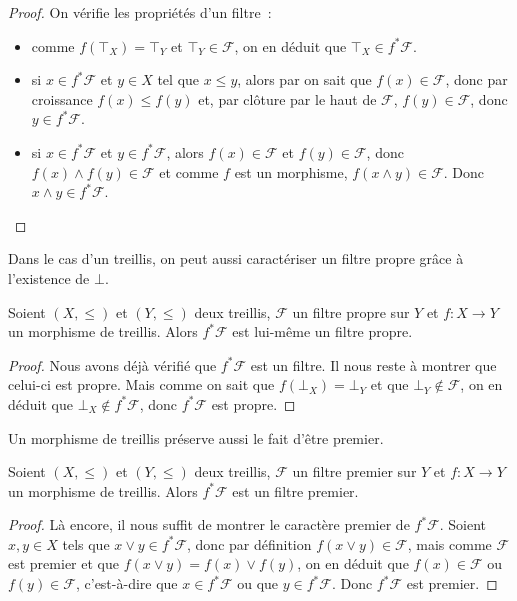 \begin{proof}
  On vérifie les propriétés d'un filtre~:
  \begin{itemize}
  \item comme $f(\top_X) = \top_Y$ et $\top_Y \in \mathcal F$, on en déduit que
    $\top_X\in f^*\mathcal F$.
  \item si $x\in f^*\mathcal F$ et $y\in X$ tel que $x\leq y$, alors par
    on sait que $f(x)\in\mathcal F$, donc par croissance $f(x)\leq f(y)$ et,
    par clôture par le haut de $\mathcal F$, $f(y)\in \mathcal F$, donc
    $y\in f^*\mathcal F$.
  \item si $x\in f^*\mathcal F$ et $y\in f^*\mathcal F$, alors
    $f(x)\in\mathcal F$ et $f(y)\in\mathcal F$, donc
    $f(x)\land f(y)\in\mathcal F$ et comme $f$ est un morphisme,
    $f(x\land y)\in\mathcal F$. Donc $x\land y\in f^*\mathcal F$.
  \end{itemize}
\end{proof}

Dans le cas d'un treillis, on peut aussi caractériser un filtre propre grâce à
l'existence de $\bot$.

\begin{property}
  Soient $(X,\leq)$ et $(Y,\leq)$ deux treillis, $\mathcal F$ un filtre propre
  sur $Y$ et $f : X \to Y$ un morphisme de treillis. Alors $f^*\mathcal F$ est
  lui-même un filtre propre.
\end{property}

\begin{proof}
  Nous avons déjà vérifié que $f^*\mathcal F$ est un filtre. Il nous reste à
  montrer que celui-ci est propre. Mais comme on sait que $f(\bot_X)=\bot_Y$
  et que $\bot_Y\notin\mathcal F$, on en déduit que
  $\bot_X\notin f^*\mathcal F$, donc $f^* \mathcal F$ est propre.
\end{proof}

Un morphisme de treillis préserve aussi le fait d'être premier.

\begin{property}
  Soient $(X,\leq)$ et $(Y,\leq)$ deux treillis, $\mathcal F$ un filtre premier
  sur $Y$ et $f : X \to Y$ un morphisme de treillis. Alors $f^*\mathcal F$ est
  un filtre premier.
\end{property}

\begin{proof}
  Là encore, il nous suffit de montrer le caractère premier de $f^*\mathcal F$.
  Soient $x,y\in X$ tels que $x\lor y \in f^*\mathcal F$, donc par définition
  $f(x\lor y)\in \mathcal F$, mais comme $\mathcal F$ est premier et que
  $f(x\lor y) = f(x)\lor f(y)$, on en déduit que $f(x)\in\mathcal F$ ou
  $f(y)\in\mathcal F$, c'est-à-dire que $x\in f^*\mathcal F$ ou que
  $y\in f^*\mathcal F$. Donc $f^*\mathcal F$ est premier.
\end{proof}

